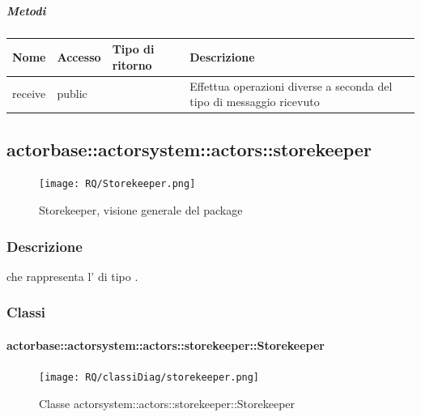 \documentclass{scalatekids-article}
\begin{document}
\subparagraph{Metodi}

\begin{tabular}{| l | l | l | l |}
  \hline
  Nome & Accesso & Tipo di ritorno & Descrizione\\
  \hline
  receive & public &  & Effettua operazioni diverse a seconda del tipo di messaggio ricevuto\\
  \hline
\end{tabular}


\subsection{actorbase::actorsystem::actors::storekeeper}
\label{sec:actorbase::actorsystem::actors::storekeeper}

\begin{figure}[H]
  \begin{center}
    \texttt{[image: RQ/Storekeeper.png]}
    \caption{Storekeeper, visione generale del package}
  \end{center}
\end{figure}

\subsubsection{Descrizione}
 che rappresenta l' di tipo .

\subsubsection{Classi}

\paragraph{actorbase::actorsystem::actors::storekeeper::Storekeeper}
\label{sec:actorbase::actorsystem::actors::storekeeper::Storekeeper}

\begin{figure}[H]
  \begin{center}
    \texttt{[image: RQ/classiDiag/storekeeper.png]}
    \caption{Classe actorsystem::actors::storekeeper::Storekeeper}
  \end{center}
\end{figure}
\end{document}
